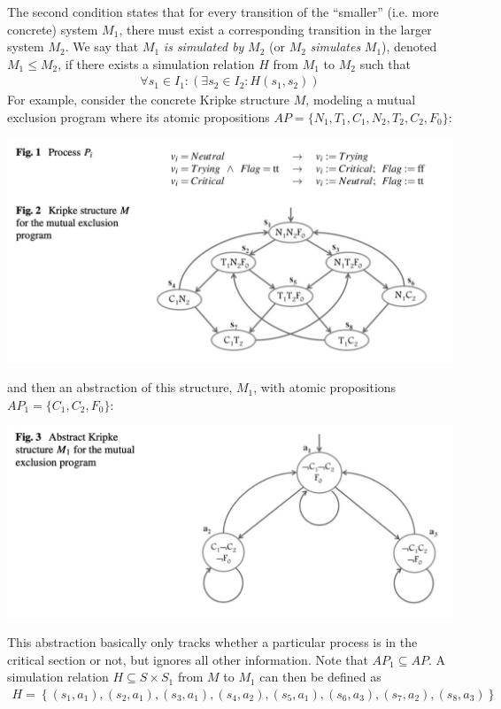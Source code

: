 \documentclass[10pt,a4paper]{article}
\begin{document}
The second condition states that for every transition of the ``smaller'' (i.e. more concrete) system $M_1$, there must exist a corresponding transition in the larger system $M_2$. We say that $M_1$ \textit{is simulated by} $M_2$ (or $M_2$ \textit{simulates} $M_1$), denoted $M_1 \leq M_2$, if there exists a simulation relation $H$ from $M_1$ to $M_2$ such that 
\begin{align*}
    \forall s_1 \in I_1 : (\exists s_2 \in I_2 : H(s_1,s_2))
\end{align*}
For example, consider the concrete Kripke structure $M$, modeling a mutual exclusion program where its atomic propositions $AP=\{N_1,T_1,C_1,N_2,T_2,C_2,F_0\}$:
\begin{center}
    \includegraphics[scale=0.35]{diagrams/concrete-mutex.png}
\end{center}
and then an abstraction of this structure, $M_1$, with atomic propositions $AP_1=\{C_1,C_2,F_0\}$:
\begin{center}
    \includegraphics[scale=0.35]{diagrams/abstract-mutex.png}
\end{center}
This abstraction basically only tracks whether a particular process is in the critical section or not, but ignores all other information. Note that $AP_1 \subseteq AP$. A simulation relation $H \subseteq S \times S_1$ from $M$ to $M_1$ can then be defined as 
\begin{align*}
    H = \left\lbrace (s_1, a_1), (s_2, a_1), (s_3, a_1), (s_4, a_2), (s_5, a_1), (s_6, a_3), (s_7, a_2), (s_8, a_3) \right\rbrace
\end{align*}
\end{document}
